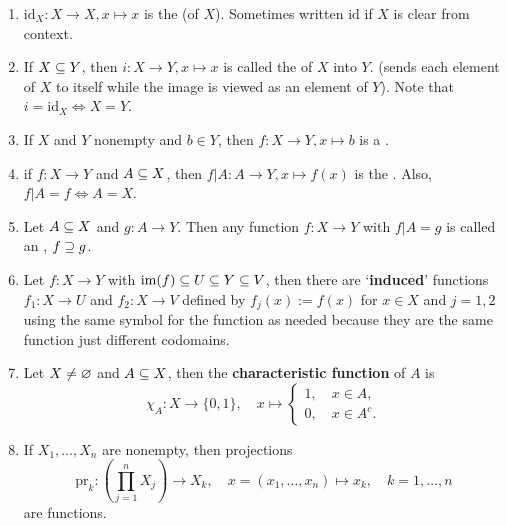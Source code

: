 \begin{example}
    \begin{enumerate}[label=(\alph*)]
        \item $\text{id}_X: X \to X, x \mapsto x$ is the  (of $X$). Sometimes written $\text{id}$ if $X$ is clear from context.

        \item If $X \subseteq Y$, then $i : X \to Y, x \mapsto x$ is called the  of $X$ into $Y$. (sends each element of $X$ to itself while the image is viewed as an element of $Y$). Note that $i = \text{id}_X \iff X = Y$.

        \item If $X$ and $Y$ nonempty and $b \in Y$, then $f : X \to Y, x \mapsto b$ is a .

        \item if $f : X \to Y$ and $A \subseteq X$, then $f|A : A \to Y, x \mapsto f(x)$ is the . Also, $f|A = f \iff A = X$.

        \item Let $A \subseteq X$ and $g: A \to Y$. Then any function $f : X \to Y$ with $f|A = g$ is called an , $f \supseteq g$.

        \item Let $f : X \to Y$ with $\text{im}(f) \subseteq U \subseteq Y \subseteq V$, then there are `\textbf{induced}' functions $f_1 : X \to U$ and $f_2 : X \to V$ defined by $f_j(x) := f(x)$ for $x \in X$ and $j = 1,2$ using the same symbol for the function as needed because they are the same function just different codomains.

        \item Let $X \neq \varnothing$ and $A \subseteq X$, then the \textbf{characteristic function} of $A$ is
            $$
            \chi_A : X \to \{0,1\}, \quad x \mapsto
            \begin{cases}
                1,\quad x \in A,\\
                0,\quad x \in A^c.
            \end{cases}
            $$

        \item If $X_1,\dots,X_n$ are nonempty, then projections
            $$
            \text{pr}_k : \left(\prod_{j=1}^n X_j\right) \to X_k, \quad x = (x_1,\dots,x_n) \mapsto x_k, \quad k = 1,\dots,n
            $$
            are functions.
    \end{enumerate}
\end{example}

